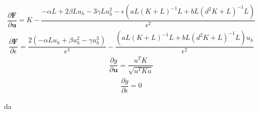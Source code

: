 \documentclass[a4paper, 11pt]{ltjsreport}
\theoremstyle{plain}
\theoremstyle{definition}
\begin{document}
\begin{align}
    \dfrac{\partial \bm{F}}{\partial \bm{u}} 
    = 
    K- \dfrac{-\alpha L + 2\beta  L u_h -3\gamma L u_h^2-\epsilon(aL(K+L)^{-1}L+bL(d^2K+L)^{-1}L) }{\epsilon^2}
\end{align}
\begin{align}
  \dfrac{\partial \bm{F}}{\partial \epsilon}
  =
  \dfrac{2(-\alpha L u_h + \beta  u_h^2 -\gamma  u_h^3)}{\epsilon^3}
  -\dfrac{(aL(K+L)^{-1}L+bL(d^2K+L)^{-1}L)u_h}{\epsilon^2}
\end{align}
\begin{align}
  \dfrac{\partial g}{\partial \bm{u}}= \dfrac{u^T K}{\sqrt{u^T K u}}
\end{align}
\begin{align}
  \dfrac{\partial g}{\partial \epsilon}=0
\end{align}

da
\end{document}
